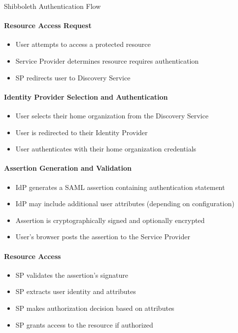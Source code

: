 \begin{KR}{Shibboleth Authentication Flow}\\
\paragraph{Resource Access Request}
\begin{itemize}
    \item User attempts to access a protected resource
    \item Service Provider determines resource requires authentication
    \item SP redirects user to Discovery Service
\end{itemize}

\paragraph{Identity Provider Selection and Authentication}
\begin{itemize}
    \item User selects their home organization from the Discovery Service
    \item User is redirected to their Identity Provider
    \item User authenticates with their home organization credentials
\end{itemize}

\paragraph{Assertion Generation and Validation}
\begin{itemize}
    \item IdP generates a SAML assertion containing authentication statement
    \item IdP may include additional user attributes (depending on configuration)
    \item Assertion is cryptographically signed and optionally encrypted
    \item User's browser posts the assertion to the Service Provider
\end{itemize}

\paragraph{Resource Access}
\begin{itemize}
    \item SP validates the assertion's signature
    \item SP extracts user identity and attributes
    \item SP makes authorization decision based on attributes
    \item SP grants access to the resource if authorized
\end{itemize}
\end{KR}

